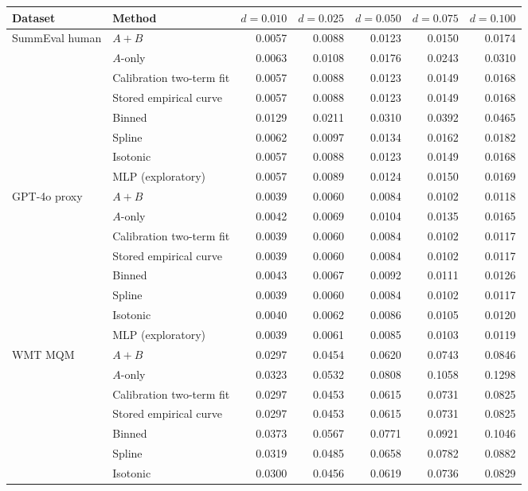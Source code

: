 \begin{tabular}{llrrrrr}
\toprule
Dataset & Method & $d=0.010$ & $d=0.025$ & $d=0.050$ & $d=0.075$ & $d=0.100$ \\
\midrule
SummEval human & $A{+}B$ & 0.0057 & 0.0088 & 0.0123 & 0.0150 & 0.0174 \\
 & $A$-only & 0.0063 & 0.0108 & 0.0176 & 0.0243 & 0.0310 \\
 & Calibration two-term fit & 0.0057 & 0.0088 & 0.0123 & 0.0149 & 0.0168 \\
 & Stored empirical curve & 0.0057 & 0.0088 & 0.0123 & 0.0149 & 0.0168 \\
 & Binned & 0.0129 & 0.0211 & 0.0310 & 0.0392 & 0.0465 \\
 & Spline & 0.0062 & 0.0097 & 0.0134 & 0.0162 & 0.0182 \\
 & Isotonic & 0.0057 & 0.0088 & 0.0123 & 0.0149 & 0.0168 \\
 & MLP (exploratory) & 0.0057 & 0.0089 & 0.0124 & 0.0150 & 0.0169 \\
\midrule
GPT-4o proxy & $A{+}B$ & 0.0039 & 0.0060 & 0.0084 & 0.0102 & 0.0118 \\
 & $A$-only & 0.0042 & 0.0069 & 0.0104 & 0.0135 & 0.0165 \\
 & Calibration two-term fit & 0.0039 & 0.0060 & 0.0084 & 0.0102 & 0.0117 \\
 & Stored empirical curve & 0.0039 & 0.0060 & 0.0084 & 0.0102 & 0.0117 \\
 & Binned & 0.0043 & 0.0067 & 0.0092 & 0.0111 & 0.0126 \\
 & Spline & 0.0039 & 0.0060 & 0.0084 & 0.0102 & 0.0117 \\
 & Isotonic & 0.0040 & 0.0062 & 0.0086 & 0.0105 & 0.0120 \\
 & MLP (exploratory) & 0.0039 & 0.0061 & 0.0085 & 0.0103 & 0.0119 \\
\midrule
WMT MQM & $A{+}B$ & 0.0297 & 0.0454 & 0.0620 & 0.0743 & 0.0846 \\
 & $A$-only & 0.0323 & 0.0532 & 0.0808 & 0.1058 & 0.1298 \\
 & Calibration two-term fit & 0.0297 & 0.0453 & 0.0615 & 0.0731 & 0.0825 \\
 & Stored empirical curve & 0.0297 & 0.0453 & 0.0615 & 0.0731 & 0.0825 \\
 & Binned & 0.0373 & 0.0567 & 0.0771 & 0.0921 & 0.1046 \\
 & Spline & 0.0319 & 0.0485 & 0.0658 & 0.0782 & 0.0882 \\
 & Isotonic & 0.0300 & 0.0456 & 0.0619 & 0.0736 & 0.0829 \\

\end{tabular}
